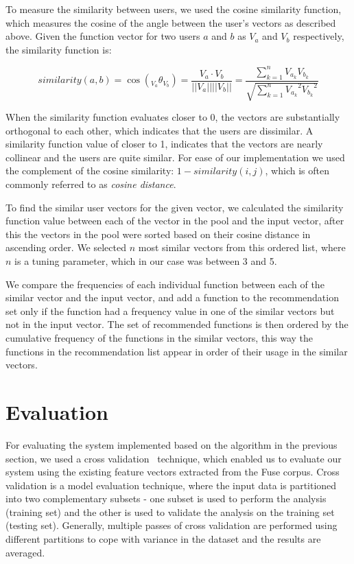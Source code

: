 \documentclass[conference]{IEEEtran}
\begin{document}
To measure the similarity between users, we used the cosine similarity function, which measures the cosine of the angle between the user's vectors as described above. Given the function vector for two users $a$ and $b$ as $V_a$ and $V_b$ respectively, the similarity function is:

\begin{center}
	\[
	similarity(a, b) = \cos({}_{V_a}\theta_{V_b}) = \frac{V_a \cdot V_b}{||V_a|| ||V_b||} = \frac{\sum\limits_{k=1}^{n} V_{a_k}V_{b_k}}{\sqrt{\sum\limits_{k=1}^{n} {V_{a_k}}^2  {V_{b_k}}^2}}
	\]
\end{center}

When the similarity function evaluates closer to 0, the vectors are substantially orthogonal to each other, which indicates that the users are dissimilar. A similarity function value of closer to 1, indicates that the vectors are nearly collinear and the users are quite similar. For ease of our implementation we used the complement of the cosine similarity: $1 - similarity(i,j)$, which is often commonly referred to as \textit{cosine distance}.

To find the similar user vectors for the given vector, we calculated the similarity function value between each of the vector in the pool and the input vector, after this the vectors in the pool were sorted based on their cosine distance in ascending order. We selected $n$ most similar vectors from this ordered list, where $n$ is a tuning parameter, which in our case was between 3 and 5.

We compare the frequencies of each individual function between each of the similar vector and the input vector, and add a function to the recommendation set only if the function had a frequency value in one of the similar vectors but not in the input vector. The set of recommended functions is then ordered by the cumulative frequency of the functions in the similar vectors, this way the functions in the recommendation list appear in order of their usage in the similar vectors.

\section{Evaluation}
For evaluating the system implemented based on the algorithm in the previous section, we used a cross validation~\cite{Kohavi95astudy} technique, which enabled us to evaluate our system using the existing feature vectors extracted from the Fuse corpus. Cross validation is a model evaluation technique, where the input data is partitioned into two complementary subsets - one subset is used to perform the analysis (training set) and the other is used to validate the analysis on the training set (testing set). Generally, multiple passes of cross validation are performed using different partitions  to cope with variance in the dataset and the results are averaged.
\end{document}
